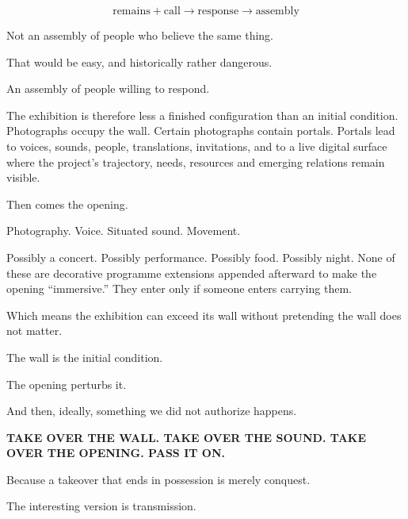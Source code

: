 \[
\text{remains}+\text{call}\rightarrow\text{response}\rightarrow\text{assembly}
\]

Not an assembly of people who believe the same thing.

That would be easy, and historically rather dangerous.

An assembly of people willing to respond.

The exhibition is therefore less a finished configuration than an
initial condition. Photographs occupy the wall. Certain photographs
contain portals. Portals lead to voices, sounds, people, translations,
invitations, and to a live digital surface where the project's
trajectory, needs, resources and emerging relations remain visible.

Then comes the opening.

Photography. Voice. Situated sound. Movement.

Possibly a concert. Possibly performance. Possibly food. Possibly night.
None of these are decorative programme extensions appended afterward to
make the opening ``immersive.'' They enter only if someone enters
carrying them.

Which means the exhibition can exceed its wall without pretending the
wall does not matter.

The wall is the initial condition.

The opening perturbs it.

And then, ideally, something we did not authorize happens.

\textbf{TAKE OVER THE WALL. TAKE OVER THE SOUND. TAKE OVER THE OPENING.
PASS IT ON.}

Because a takeover that ends in possession is merely conquest.

The interesting version is transmission.
